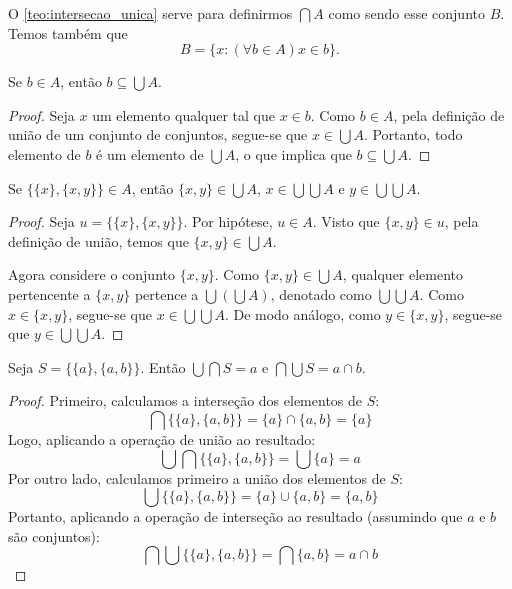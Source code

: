 O \autoref{teo:intersecao_unica} serve para definirmos \(\bigcap A\) como sendo esse conjunto \(B\). Temos também que
\[
    B = \{x: (\forall b \in A)x \in b\}.
\]

\begin{proposicao}
    \label{prop:elemento_contido_uniao}
    Se \( b \in A \), então \( b \subseteq \bigcup A \).
\end{proposicao}

\begin{proof}
    Seja \( x \) um elemento qualquer tal que \( x \in b \). Como \( b \in A \), pela definição de união de um conjunto de conjuntos, segue-se que \( x \in \bigcup A \). Portanto, todo elemento de \( b \) é um elemento de \( \bigcup A \), o que implica que \( b \subseteq \bigcup A \).
\end{proof}

\begin{proposicao}
    \label{prop:ordenado_elemento_par_uniao}
    Se \( \{\{x\}, \{x, y\}\} \in A \), então \( \{x, y\} \in \bigcup A \), \( x \in \bigcup\bigcup A \) e \( y \in \bigcup\bigcup A \).
\end{proposicao}

\begin{proof}
    Seja \( u = \{\{x\}, \{x, y\}\} \). Por hipótese, \( u \in A \). Visto que \( \{x, y\} \in u \), pela definição de união, temos que \( \{x, y\} \in \bigcup A \).

    Agora considere o conjunto \( \{x, y\} \). Como \( \{x, y\} \in \bigcup A \), qualquer elemento pertencente a \( \{x, y\} \) pertence a \( \bigcup(\bigcup A) \), denotado como \( \bigcup\bigcup A \).
    Como \( x \in \{x, y\} \), segue-se que \( x \in \bigcup\bigcup A \).
    De modo análogo, como \( y \in \{x, y\} \), segue-se que \( y \in \bigcup\bigcup A \).
\end{proof}

\begin{proposicao}
    \label{prop:par_cupcap_capcup}
    Seja \( S = \{\{a\}, \{a, b\}\} \). Então \( \bigcup\bigcap S = a \) e \( \bigcap\bigcup S = a \cap b \).
\end{proposicao}

\begin{proof}
    Primeiro, calculamos a interseção dos elementos de \( S \):
    \[
        \bigcap\{\{a\}, \{a, b\}\} = \{a\} \cap \{a, b\} = \{a\}
    \]
    Logo, aplicando a operação de união ao resultado:
    \[
        \bigcup\bigcap\{\{a\}, \{a, b\}\} = \bigcup\{a\} = a
    \]
    Por outro lado, calculamos primeiro a união dos elementos de \( S \):
    \[
        \bigcup\{\{a\}, \{a, b\}\} = \{a\} \cup \{a, b\} = \{a, b\}
    \]
    Portanto, aplicando a operação de interseção ao resultado (assumindo que \( a \) e \( b \) são conjuntos):
    \[
        \bigcap\bigcup\{\{a\}, \{a, b\}\} = \bigcap\{a, b\} = a \cap b
    \]
\end{proof}

